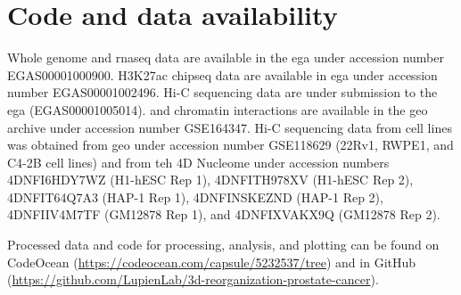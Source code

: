 \section{Code and data availability}

Whole genome and \gls{rnaseq} data are available in the \gls{ega} under accession number EGAS00001000900.
H3K27ac \gls{chipseq} data are available in \gls{ega} under accession number EGAS00001002496.
Hi-C sequencing data are under submission to the \gls{ega} (EGAS00001005014).
 and chromatin interactions are available in the \gls{geo} archive under accession number GSE164347.
Hi-C sequencing data from cell lines was obtained from \gls{geo} under accession number GSE118629 (22Rv1, RWPE1, and C4-2B cell lines) and from teh 4D Nucleome under accession numbers 4DNFI6HDY7WZ (H1-hESC Rep 1), 4DNFITH978XV (H1-hESC Rep 2), 4DNFIT64Q7A3 (HAP-1 Rep 1), 4DNFINSKEZND (HAP-1 Rep 2), 4DNFIIV4M7TF (GM12878 Rep 1), and 4DNFIXVAKX9Q (GM12878 Rep 2).

Processed data and code for processing, analysis, and plotting can be found on CodeOcean (\url{https://codeocean.com/capsule/5232537/tree}) and in GitHub (\url{https://github.com/LupienLab/3d-reorganization-prostate-cancer}).
